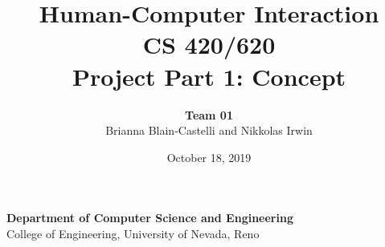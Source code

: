 \documentclass{article}
\title{\textbf{Human-Computer Interaction} \\ \Large{CS 420/620} \\ \large{Project Part 1: Concept} \vspace{+16ex}}
\author{\textbf{\Large Team 01} \\ \large{Brianna Blain-Castelli and Nikkolas Irwin}}
\date{\vspace{-2ex} \large{October 18, 2019}}
\begin{document}
\maketitle

\begin{center}
    \vspace{+16ex}
    {\textbf{\Large{Department of Computer Science and Engineering}} \\
    \large{College of Engineering, University of Nevada, Reno}}
\end{center}


\newpage
{}
\tableofcontents
\newpage

\setlength{\cfttabindent}{0pt}  %
\listoftables

\doublespacing
\newpage
{}


\newpage

\newpage
\renewcommand\refname{Project Resources}

\end{document}

